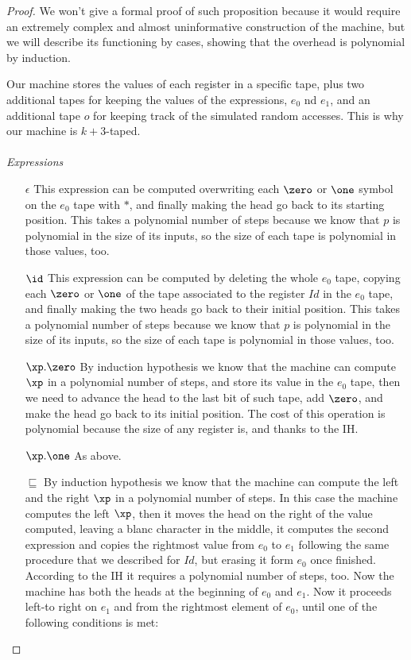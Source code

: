 \begin{proof}
We won't give a formal proof of such proposition because it would require an extremely complex and almost uninformative construction of the machine, but we will describe its functioning by cases, showing that the overhead is polynomial by induction.

Our machine stores the values of each register in a specific tape, plus two additional tapes for keeping the values of the expressions, $e_0$ nd $e_1$, and an additional tape $o$ for keeping track of the simulated random accesses. This is why our machine is $k+3$-taped.
\\\\
\emph{Expressions}
\begin{itemize}
\item[$\epsilon$] This expression can be computed overwriting each $\zero$ or $\one$ symbol on the $e_0$ tape with $*$, and finally making the head go back to its starting position. This takes a polynomial number of steps because we know that $p$ is polynomial in the size of its inputs, so the size of each tape is polynomial in those values, too.
\item[$\id$] This expression can be computed by deleting the whole $e_0$ tape, copying each $\zero$ or $\one$ of the tape associated to the register $Id$ in the $e_0$ tape, and finally making the two heads go back to their initial position. This takes a polynomial number of steps because we know that $p$ is polynomial in the size of its inputs, so the size of each tape is polynomial in those values, too.
\item[$\xp.\zero$] By induction hypothesis we know that the machine can compute $\xp$ in a polynomial number of steps, and store its value in the $e_0$ tape, then we need to advance the head to the last bit of such tape, add $\zero$, and make the head go back to its initial position. The cost of this operation is polynomial because the size of any register is, and thanks to the IH.
\item[$\xp.\one$] As above.
\item[$\sqsubseteq$] By induction hypothesis we know that the machine can compute the left and the right $\xp$ in a polynomial number of steps. In this case the machine computes the left $\xp$, then it moves the head on the right of the value computed, leaving a blanc character in the middle, it computes the second expression and copies the rightmost value from $e_0$ to $e_1$ following the same procedure that we described for $Id$, but erasing it form $e_0$ once finished. According to the IH it requires a polynomial number of steps, too. Now the machine has both the heads at the beginning of $e_0$ and $e_1$. Now it proceeds left-to right on $e_1$ and from the rightmost element of $e_0$, until one of the following conditions is met:

\end{itemize}
\end{proof}
